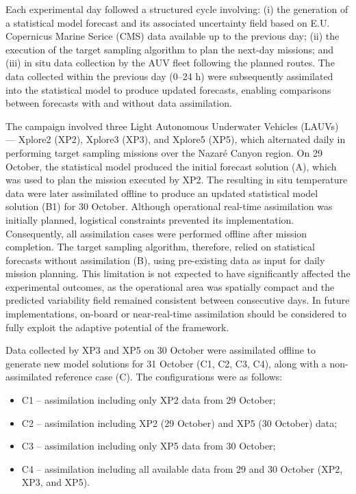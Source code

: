 Each experimental day followed a structured cycle involving: (i) the
generation of a statistical model forecast and its associated
uncertainty field based on E.U. Copernicus Marine Serice (CMS)
\cite{sotillo2021} data available up to the previous day; (ii) the
execution of the target sampling algorithm to plan the next-day
missions; and (iii) in situ data collection by the AUV fleet following
the planned routes. The data collected within the previous day (0–24
h) were subsequently assimilated into the statistical model to produce
updated forecasts, enabling comparisons between forecasts with and
without data assimilation.

The campaign involved three Light Autonomous Underwater Vehicles
(LAUVs) — Xplore2 (XP2), Xplore3 (XP3), and Xplore5 (XP5), which
alternated daily in performing target sampling missions over the
Nazaré Canyon region. On 29 October, the statistical model produced
the initial forecast solution (A), which was used to plan the mission
executed by XP2. The resulting in situ temperature data were later
assimilated offline to produce an updated statistical model solution
(B1) for 30 October. Although operational real-time assimilation was
initially planned, logistical constraints prevented its
implementation. Consequently, all assimilation cases were performed
offline after mission completion. The target sampling algorithm,
therefore, relied on statistical forecasts without assimilation (B),
using pre-existing data as input for daily mission planning. This
limitation is not expected to have significantly affected the
experimental outcomes, as the operational area was spatially compact
and the predicted variability field remained consistent between
consecutive days. In future implementations, on-board or
near-real-time assimilation should be considered to fully exploit the
adaptive potential of the framework.

Data collected by XP3 and XP5 on 30 October were assimilated offline
to generate new model solutions for 31 October (C1, C2, C3, C4), along
with a non-assimilated reference case (C). The configurations were as
follows:

\begin{itemize}
    \item C1 – assimilation including only XP2 data from 29 October;
    \item C2 – assimilation including XP2 (29 October) and XP5 (30 October) data;
    \item C3 – assimilation including only XP5 data from 30 October;
    \item C4 – assimilation including all available data from 29 and 30 October (XP2, XP3, and XP5).
\end{itemize}

